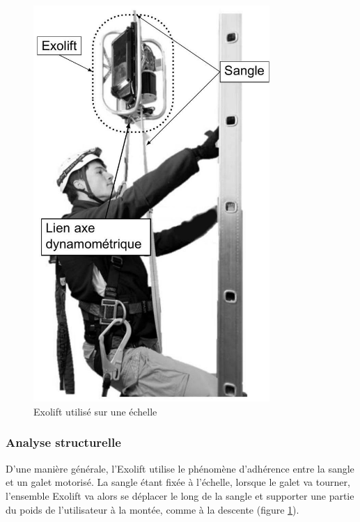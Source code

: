 \begin{figure}[!htb]
\begin{minipage}{0.5\textwidth}
\begin{center}
\includegraphics[width=0.8\textwidth]{images/2023_10_30_d11e80da56f59e3b3cdfg-02}
\caption{Exolift utilisé sur une échelle \label{fig1}}
\end{center}
\end{minipage}
\end{figure}


\subsubsection{Analyse structurelle}
D'une manière générale, l'Exolift utilise le phénomène d'adhérence entre la sangle et un galet motorisé. La sangle étant fixée à l'échelle, lorsque le galet va tourner, l'ensemble Exolift va alors se déplacer le long de la sangle et supporter une partie du poids de l'utilisateur à la montée, comme à la descente (figure \ref{fig1}).

